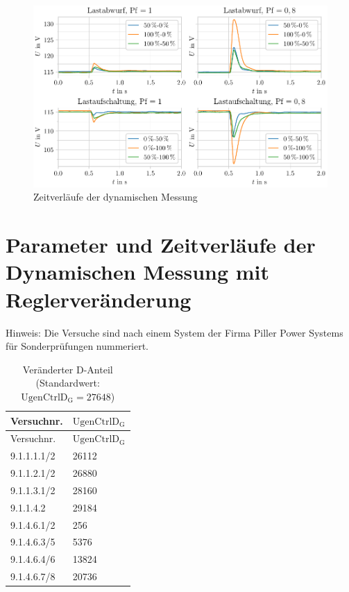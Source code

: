 \begin{figure}[H]
	\centering
	\includegraphics{Bilder/DynamischeMessung.pdf}
	\caption{Zeitverläufe der dynamischen Messung}
	\label{fig:ZeitverlaufDynamischOhneRegleraenderung}
\end{figure}

\section{Parameter und Zeitverläufe der Dynamischen Messung mit Reglerveränderung}
\label{sec:ReglerparameterDynamischeMessung}
Hinweis: Die Versuche sind nach einem System der Firma Piller Power Systems für Sonderprüfungen nummeriert.

\begin{longtable}[]{ll}
    \caption{Veränderter D-Anteil (Standardwert: $\mathrm{UgenCtrlD_G}=27648$)}
    \label{tab:Parameter-D-Messung}
    \tabularnewline
    \toprule
    Versuchnr.     & $\mathrm{UgenCtrlD_G}$ \\
    \midrule
    \endfirsthead
    \toprule
    Versuchnr.     & $\mathrm{UgenCtrlD_G}$ \\
    \midrule
    \endhead    
    9.1.1.1.1/2 & 26112        \\
    9.1.1.2.1/2 & 26880        \\
    9.1.1.3.1/2 & 28160        \\
    9.1.1.4.2 & 29184        \\
    9.1.4.6.1/2 & 256          \\
    9.1.4.6.3/5 & 5376         \\
    9.1.4.6.4/6 & 13824        \\
    9.1.4.6.7/8 & 20736        \\
    \bottomrule
\end{longtable}

